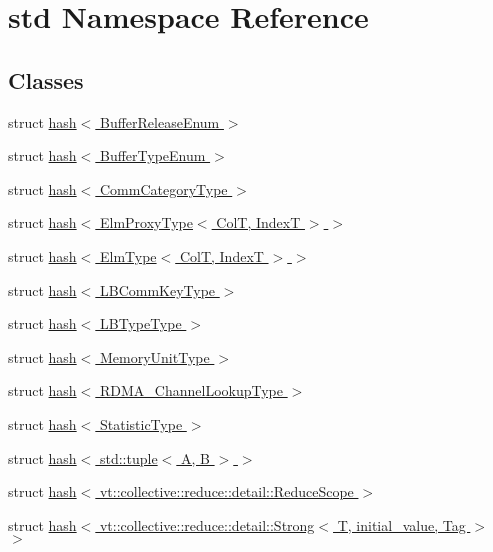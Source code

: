 \hypertarget{namespacestd}{}\section{std Namespace Reference}
\label{namespacestd}
\subsection*{Classes}
\begin{DoxyCompactItemize}
\item 
struct \hyperlink{structstd_1_1hash_3_01_buffer_release_enum_01_4}{hash$<$ Buffer\+Release\+Enum $>$}
\item 
struct \hyperlink{structstd_1_1hash_3_01_buffer_type_enum_01_4}{hash$<$ Buffer\+Type\+Enum $>$}
\item 
struct \hyperlink{structstd_1_1hash_3_01_comm_category_type_01_4}{hash$<$ Comm\+Category\+Type $>$}
\item 
struct \hyperlink{structstd_1_1hash_3_01_elm_proxy_type_3_01_col_t_00_01_index_t_01_4_01_4}{hash$<$ Elm\+Proxy\+Type$<$ Col\+T, Index\+T $>$ $>$}
\item 
struct \hyperlink{structstd_1_1hash_3_01_elm_type_3_01_col_t_00_01_index_t_01_4_01_4}{hash$<$ Elm\+Type$<$ Col\+T, Index\+T $>$ $>$}
\item 
struct \hyperlink{structstd_1_1hash_3_01_l_b_comm_key_type_01_4}{hash$<$ L\+B\+Comm\+Key\+Type $>$}
\item 
struct \hyperlink{structstd_1_1hash_3_01_l_b_type_type_01_4}{hash$<$ L\+B\+Type\+Type $>$}
\item 
struct \hyperlink{structstd_1_1hash_3_01_memory_unit_type_01_4}{hash$<$ Memory\+Unit\+Type $>$}
\item 
struct \hyperlink{structstd_1_1hash_3_01_r_d_m_a___channel_lookup_type_01_4}{hash$<$ R\+D\+M\+A\+\_\+\+Channel\+Lookup\+Type $>$}
\item 
struct \hyperlink{structstd_1_1hash_3_01_statistic_type_01_4}{hash$<$ Statistic\+Type $>$}
\item 
struct \hyperlink{structstd_1_1hash_3_01std_1_1tuple_3_01_a_00_01_b_01_4_01_4}{hash$<$ std\+::tuple$<$ A, B $>$ $>$}
\item 
struct \hyperlink{structstd_1_1hash_3_01vt_1_1collective_1_1reduce_1_1detail_1_1_reduce_scope_01_4}{hash$<$ vt\+::collective\+::reduce\+::detail\+::\+Reduce\+Scope $>$}
\item 
struct \hyperlink{structstd_1_1hash_3_01vt_1_1collective_1_1reduce_1_1detail_1_1_strong_3_01_t_00_01initial__value_00_01_tag_01_4_01_4}{hash$<$ vt\+::collective\+::reduce\+::detail\+::\+Strong$<$ T, initial\+\_\+value, Tag $>$ $>$}

\end{DoxyCompactItemize}
